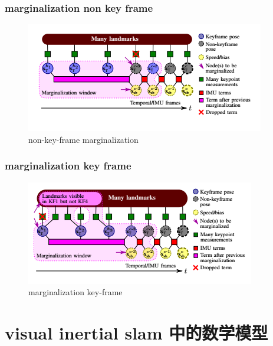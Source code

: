 \documentclass[10pt,a4paper]{article}
\begin{document}
\subsubsection{marginalization non key frame}
\begin{figure}[h!]
	\centering
	\includegraphics[width=0.7\linewidth]{images/okvis-marginalization-nonkeyframe}
	\caption{non-key-frame marginalization}
	\label{fig:okvis-marginalization-nonkeyframe}
\end{figure}

\subsubsection{marginalization key frame}
\begin{figure}[h!]
	\centering
	\includegraphics[width=0.7\linewidth]{images/okvis-marginalization-keyframe}
	\caption{marginalization key-frame}
	\label{fig:okvis-marginalization-keyframe}
\end{figure}


\section{visual inertial slam 中的数学模型}
\end{document}
